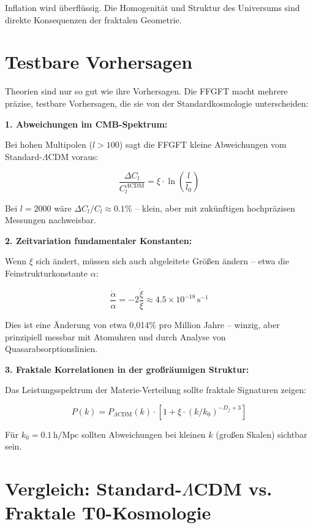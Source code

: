 Inflation wird überflüssig. Die Homogenität und Struktur des Universums sind direkte Konsequenzen der fraktalen Geometrie.

\section{Testbare Vorhersagen}

Theorien sind nur so gut wie ihre Vorhersagen. Die FFGFT macht mehrere präzise, testbare Vorhersagen, die sie von der Standardkosmologie unterscheiden:

\textbf{1. Abweichungen im CMB-Spektrum:}

Bei hohen Multipolen ($l > 100$) sagt die FFGFT kleine Abweichungen vom Standard-$\Lambda$CDM voraus:

\begin{equation}
\frac{\Delta C_l}{C_l^{\Lambda\text{CDM}}} = \xi \cdot \ln\left(\frac{l}{l_0}\right)
\end{equation}

Bei $l = 2000$ wäre $\Delta C_l/C_l \approx 0.1\%$ -- klein, aber mit zukünftigen hochpräzisen Messungen nachweisbar.

\textbf{2. Zeitvariation fundamentaler Konstanten:}

Wenn $\xi$ sich ändert, müssen sich auch abgeleitete Größen ändern -- etwa die Feinstrukturkonstante $\alpha$:

\begin{equation}
\frac{\dot{\alpha}}{\alpha} = -2 \frac{\dot{\xi}}{\xi} \approx 4.5 \times 10^{-18} \, \text{s}^{-1}
\end{equation}

Dies ist eine Änderung von etwa 0{,}014\% pro Million Jahre -- winzig, aber prinzipiell messbar mit Atomuhren und durch Analyse von Quasarabsorptionslinien.

\textbf{3. Fraktale Korrelationen in der großräumigen Struktur:}

Das Leistungsspektrum der Materie-Verteilung sollte fraktale Signaturen zeigen:

\begin{equation}
P(k) = P_{\Lambda\text{CDM}}(k) \cdot \left[1 + \xi \cdot (k/k_0)^{-D_f+3}\right]
\end{equation}

Für $k_0 = 0.1 \, \text{h/Mpc}$ sollten Abweichungen bei kleinen $k$ (großen Skalen) sichtbar sein.

\section{Vergleich: Standard-$\Lambda$CDM vs. Fraktale T0-Kosmologie}

